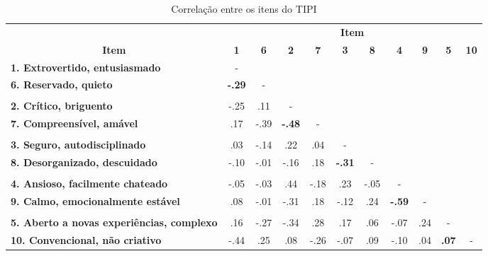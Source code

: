 \begin{sidewaystable}[ph!]
\footnotesize
\caption{\small Correlação entre os itens do TIPI}
\renewcommand{\arraystretch}{1.4} 
\centering

    \begin{tabular}{lcccccccccc}
    \toprule
          & \multicolumn{10}{c}{\textbf{Item}} \\
    \multicolumn{1}{c}{\textbf{Item}} & \textbf{1} & \textbf{6} & \textbf{2} & \textbf{7} & \textbf{3} & \textbf{8} & \textbf{4} & \textbf{9} & \textbf{5} & \textbf{10} \\
		\midrule
    \multicolumn{1}{l}{\textbf{1. Extrovertido, entusiasmado}} 						& -     &       &       &       &       &       &       &       &       &  \\
    \multicolumn{1}{l}{\textbf{6. Reservado, quieto}} 										& \textbf{-.29}	& -     &       &       &       &       &       &       &       &  \\
    \textbf{} & & & & & & & & & &  \\
    \multicolumn{1}{l}{\textbf{2. Crítico, briguento}} 										& -.25  & .11   & -     &       &       &       &       &       &       &  \\
    \multicolumn{1}{l}{\textbf{7. Compreensível, amável}} 								& .17   & -.39  & \textbf{-.48} & -     &       &       &       &       &       &  \\
    \textbf{} & & & & & & & & & &  \\
    \multicolumn{1}{l}{\textbf{3. Seguro, autodisciplinado}} 						& .03   & -.14  & .22   & .04   & -     &       &       &       &       &  \\
    \multicolumn{1}{l}{\textbf{8. Desorganizado, descuidado}} 						& -.10  & -.01  & -.16  & .18   & \textbf{-.31} & -     &       &       &       &  \\
    \textbf{} & & & & & & & & & &  \\
    \multicolumn{1}{l}{\textbf{4. Ansioso, facilmente chateado}} 					& -.05  & -.03  & .44   & -.18  & .23   & -.05  & -     &       &       &  \\
    \multicolumn{1}{l}{\textbf{9. Calmo, emocionalmente estável}} 				& .08   & -.01  & -.31  & .18   & -.12  & .24   & \textbf{-.59} & -     &       &  \\
    \textbf{} & & & & & & & & & &  \\
    \multicolumn{1}{l}{\textbf{5. Aberto a novas experiências, complexo}} & .16   & -.27  & -.34  & .28   & .17   & .06   & -.07  & .24   & -     &  \\
    \multicolumn{1}{l}{\textbf{10. Convencional, não criativo}} 					& -.44  & .25   & .08   & -.26  & -.07  & .09   & -.10  & .04   & \textbf{.07} & - \\
    

\end{tabular}
\end{sidewaystable}
